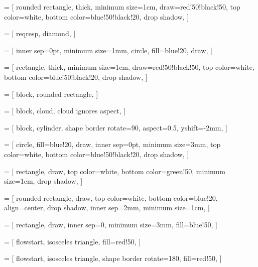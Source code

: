  = [
rounded rectangle,
thick,
minimum size=1cm,
draw=red!50!black!50,
top color=white,
bottom color=blue!50!black!20,
drop shadow,
]

 = [
reqresp,
diamond,
]

 = [
inner sep=0pt,
minimum size=1mm,
circle,
fill=blue!20,
draw,
]

 = [
rectangle,
thick,
minimum size=1cm,
draw=red!50!black!50,
top color=white,
bottom color=blue!50!black!20,
drop shadow,
]

 = [
block,
rounded rectangle,
]

 = [
block,
cloud,
cloud ignores aspect,
]

 = [
block,
cylinder,
shape border rotate=90,
aspect=0.5,
yshift=-2mm,
]

 = [
circle,
fill=blue!20,
draw,
inner sep=0pt,
minimum size=3mm,
top color=white,
bottom color=blue!50!black!20,
drop shadow,
]

 = [
rectangle,
draw,
top color=white,
bottom color=green!50,
minimum size=1cm,
drop shadow,
]

 = [
rounded rectangle,
draw,
top color=white,
bottom color=blue!20,
align=center,
drop shadow,
inner sep=2mm,
minimum size=1cm,
]

 = [
rectangle,
draw,
inner sep=0,
minimum size=3mm,
fill=blue!50,
]

 = [
flowstart,
isosceles triangle,
fill=red!50,
]

 = [
flowstart,
isosceles triangle,
shape border rotate=180,
fill=red!50,
]

\newcommand{\flow}[6]
{
\node[flowstart] (s#2) at (#3,-#2){};
\node[flowend-#1](e#2) at (#4,-#2){};
\path (s#2) edge node(m#2){} (e#2){};
\node[above,align=left](a#2) at  (m#2){\texttt{#5}};
\node[below,align=left](b#2) at  (m#2){\texttt{#6}}; 
}